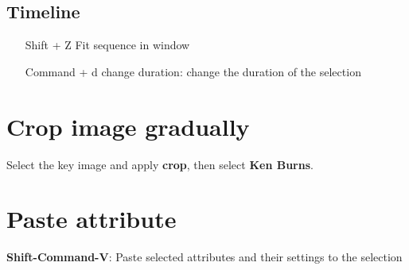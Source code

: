 \documentclass[10pt,a4paper]{article}
\begin{document}
\subsection{Timeline}
\begin{itemize}
\item[Shift + Z] Fit sequence in window
\item[Command + d] change duration: change the duration of the selection
\end{itemize}

\section{Crop image gradually}
Select the key image and apply \textbf{crop}, then select \textbf{Ken Burns}.

\section{Paste attribute}
\textbf{Shift-Command-V}: Paste selected attributes and their settings to the selection
\end{document}
